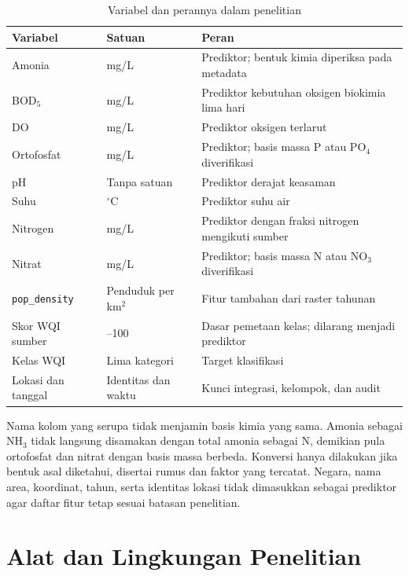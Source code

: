\begin{table}[H]
    \centering
    \caption{Variabel dan perannya dalam penelitian}
    \label{tab:bab3-variabel}
    \small
    \renewcommand{\arraystretch}{1.16}
    \begin{tabularx}{\linewidth}{@{}p{3.0cm}>{\raggedright\arraybackslash}p{2.0cm}>{\raggedright\arraybackslash}X@{}}
        \toprule
        Variabel & Satuan & Peran \\
        \midrule
        Amonia & mg/L & Prediktor; bentuk kimia diperiksa pada metadata \\
        BOD$_5$ & mg/L & Prediktor kebutuhan oksigen biokimia lima hari \\
        DO & mg/L & Prediktor oksigen terlarut \\
        Ortofosfat & mg/L & Prediktor; basis massa P atau PO$_4$ diverifikasi \\
        pH & Tanpa satuan & Prediktor derajat keasaman \\
        Suhu & $^{\circ}$C & Prediktor suhu air \\
        Nitrogen & mg/L & Prediktor dengan fraksi nitrogen mengikuti sumber \\
        Nitrat & mg/L & Prediktor; basis massa N atau NO$_3$ diverifikasi \\
        \texttt{pop\_density} & Penduduk per km$^2$ & Fitur tambahan dari raster tahunan \\
        Skor WQI sumber & 0--100 & Dasar pemetaan kelas; dilarang menjadi prediktor \\
        Kelas WQI & Lima kategori & Target klasifikasi \\
        Lokasi dan tanggal & Identitas dan waktu & Kunci integrasi, kelompok, dan audit \\
        \bottomrule
    \end{tabularx}
\end{table}

Nama kolom yang serupa tidak menjamin basis kimia yang sama. Amonia sebagai NH$_3$ tidak langsung disamakan dengan total amonia sebagai N, demikian pula ortofosfat dan nitrat dengan basis massa berbeda. Konversi hanya dilakukan jika bentuk asal diketahui, disertai rumus dan faktor yang tercatat. Negara, nama area, koordinat, tahun, serta identitas lokasi tidak dimasukkan sebagai prediktor agar daftar fitur tetap sesuai batasan penelitian.

\section{Alat dan Lingkungan Penelitian}

